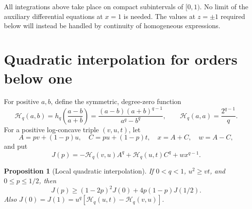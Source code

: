 \documentclass[11pt,a4paper]{amsart}
\numberwithin{equation}{section}
\newtheorem{proposition}[theorem]{Proposition}
\theoremstyle{remark}
\newcommand{\HH}{\mathscr H}
\begin{document}
All integrations above take place on compact subintervals of
$[0,1)$. No limit of the auxiliary differential equations at $x=1$
is needed. The values at $z=\pm1$ required below will instead be
handled by continuity of homogeneous expressions.

\section{Quadratic interpolation for orders below one}
\label{sec:lowerbellman}

For positive $a,b$, define the symmetric, degree-zero function
\begin{equation}
\HH_q(a,b)=h_q\!\left(\frac{a-b}{a+b}\right)
 =\frac{(a-b)(a+b)^{q-1}}{a^q-b^q},
\qquad \HH_q(a,a)=\frac{2^{q-1}}q.
\label{eq:edgeH}
\end{equation}
For a positive log-concave triple $(v,u,t)$, let
\begin{equation}
A=pv+(1-p)u,\quad C=pu+(1-p)t,\quad x=A+C,\quad w=A-C,
\label{eq:localAC}
\end{equation}
and put
\begin{equation}
J(p)=-\HH_q(v,u)A^q+\HH_q(u,t)C^q+w x^{q-1}.
\label{eq:localJ}
\end{equation}

\begin{proposition}[Local quadratic interpolation]
\label{prop:localchord}
If $0<q<1$, $u^2\ge vt$, and $0\le p\le1/2$, then
\begin{equation}
J(p)\ge(1-2p)^2J(0)+4p(1-p)J(1/2).
\label{eq:localchord}
\end{equation}
Also $J(0)=J(1)=u^q[\HH_q(u,t)-\HH_q(v,u)]$.
\end{proposition}
\end{document}
